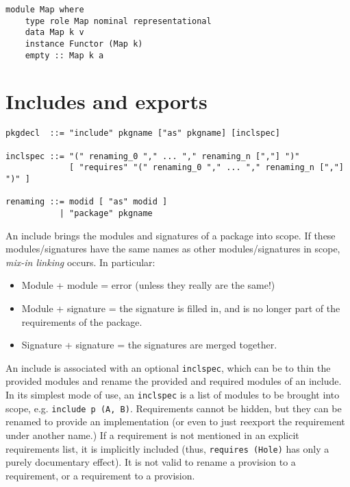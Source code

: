 \documentclass{article}
\begin{document}
\begin{verbatim}
module Map where
    type role Map nominal representational
    data Map k v
    instance Functor (Map k)
    empty :: Map k a
\end{verbatim}

\section{Includes and exports}

\begin{verbatim}
pkgdecl  ::= "include" pkgname ["as" pkgname] [inclspec]

inclspec ::= "(" renaming_0 "," ... "," renaming_n [","] ")"
             [ "requires" "(" renaming_0 "," ... "," renaming_n [","] ")" ]

renaming ::= modid [ "as" modid ]
           | "package" pkgname
\end{verbatim}


An include brings the modules and signatures of a package into scope.
If these modules/signatures have the same names as other
modules/signatures in scope, \emph{mix-in linking} occurs.
In particular:

\begin{itemize}
    \item Module + module = error (unless they really are the same!)
    \item Module + signature = the signature is filled in, and is
        no longer part of the requirements of the package.
    \item Signature + signature = the signatures are merged together.
\end{itemize}

An include is associated with an optional \verb|inclspec|,
which can be to thin the provided modules and rename the provided and
required modules of an include.  In its simplest mode of use,
an \verb|inclspec| is a list of modules to be brought into scope,
e.g. \verb|include p (A, B)|.  Requirements cannot be hidden, but
they can be renamed to provide an implementation (or even to just
reexport the requirement under another name.)  If a requirement is
not mentioned in an explicit requirements list, it is implicitly included
(thus, \verb|requires (Hole)| has only a purely documentary effect).
It is not valid to rename a provision to a requirement, or a requirement
to a provision.
\end{document}
